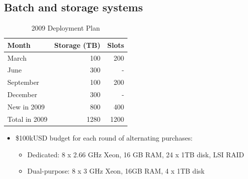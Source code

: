 \documentclass{beamer}
\begin{document}
\subsection{Batch and storage systems}
\begin{frame}
\begin{table}
\begin{tabular}{lrr}
    \toprule
    Month           &   Storage (TB)    &   Slots \\
    \midrule
    March           &   100             &   200 \\
    June            &   300             &   - \\
    September       &   100             &   200 \\
    December        &   300             &   - \\
    \midrule
    New in 2009     &   800             &   400 \\
    Total in 2009   &   1280            &   1200 \\
    \bottomrule
\end{tabular}
\caption{2009 Deployment Plan}
\label{2009_deployment_plan}
\end{table}

\begin{itemize}
    \item \$100kUSD budget for each round of alternating purchases:
    \begin{itemize}
        \item Dedicated: 8 x 2.66 GHz Xeon, 16 GB RAM, 24 x 1TB disk, LSI RAID
        \item Dual-purpose: 8 x 3 GHz Xeon, 16GB RAM, 4 x 1TB disk
    \end{itemize}
\end{itemize}

\end{frame}
\end{document}
